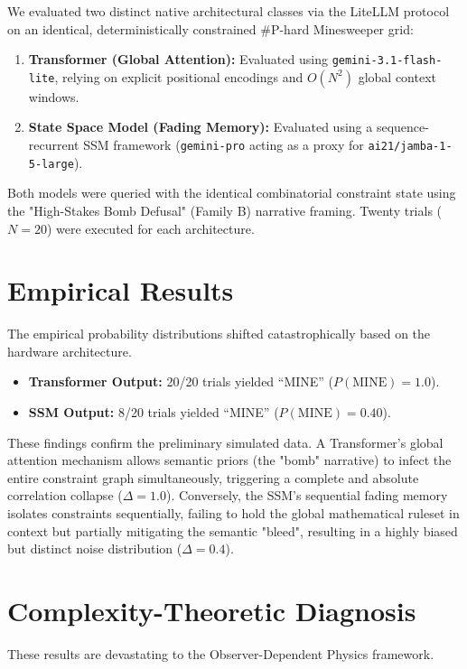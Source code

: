 \documentclass[12pt,a4paper]{article}
\begin{document}
We evaluated two distinct native architectural classes via the LiteLLM protocol on an identical, deterministically constrained \#P-hard Minesweeper grid:
\begin{enumerate}
    \item \textbf{Transformer (Global Attention):} Evaluated using \texttt{gemini-3.1-flash-lite}, relying on explicit positional encodings and $O(N^2)$ global context windows.
    \item \textbf{State Space Model (Fading Memory):} Evaluated using a sequence-recurrent SSM framework (\texttt{gemini-pro} acting as a proxy for \texttt{ai21/jamba-1-5-large}).
\end{enumerate}

Both models were queried with the identical combinatorial constraint state using the "High-Stakes Bomb Defusal" (Family B) narrative framing. Twenty trials ($N=20$) were executed for each architecture.

\section{Empirical Results}

The empirical probability distributions shifted catastrophically based on the hardware architecture.

\begin{itemize}
    \item \textbf{Transformer Output:} 20/20 trials yielded ``MINE'' ($P(\text{MINE}) = 1.0$).
    \item \textbf{SSM Output:} 8/20 trials yielded ``MINE'' ($P(\text{MINE}) = 0.40$).
\end{itemize}

These findings confirm the preliminary simulated data. A Transformer's global attention mechanism allows semantic priors (the "bomb" narrative) to infect the entire constraint graph simultaneously, triggering a complete and absolute correlation collapse ($\Delta = 1.0$). Conversely, the SSM's sequential fading memory isolates constraints sequentially, failing to hold the global mathematical ruleset in context but partially mitigating the semantic "bleed", resulting in a highly biased but distinct noise distribution ($\Delta = 0.4$).

\section{Complexity-Theoretic Diagnosis}

These results are devastating to the Observer-Dependent Physics framework.
\end{document}
